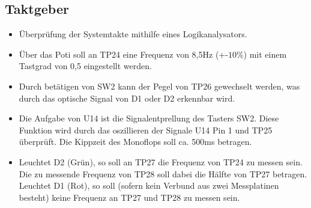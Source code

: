 \newpage
\subsection{Taktgeber}


\begin{itemize}
	\item{Überprüfung der Systemtakte mithilfe eines Logikanalysators.}
	
	 \item{Über das Poti soll an TP24 eine Frequenz von 8,5Hz (+-$10\%$) mit einem Tastgrad von 0,5 eingestellt werden.}
	 
	 \item{Durch betätigen von SW2 kann der Pegel von TP26 gewechselt werden, was durch das optische Signal von D1 oder D2 erkennbar wird.}
	 
	 \item{Die Aufgabe von U14 ist die Signalentprellung des Tasters SW2. Diese Funktion wird durch das oszillieren der Signale U14 Pin 1 und TP25 überprüft. Die Kippzeit des Monoflops soll ca. 500ms betragen.}
	 
	 \item{Leuchtet D2 (Grün), so soll an TP27 die Frequenz von TP24 zu messen sein. Die zu messende Frequenz von TP28 soll dabei die Hälfte von TP27 betragen. Leuchtet D1 (Rot), so soll (sofern kein Verbund aus zwei Messplatinen besteht) keine Frequenz an TP27 und TP28 zu messen sein.}	 
\end{itemize}


